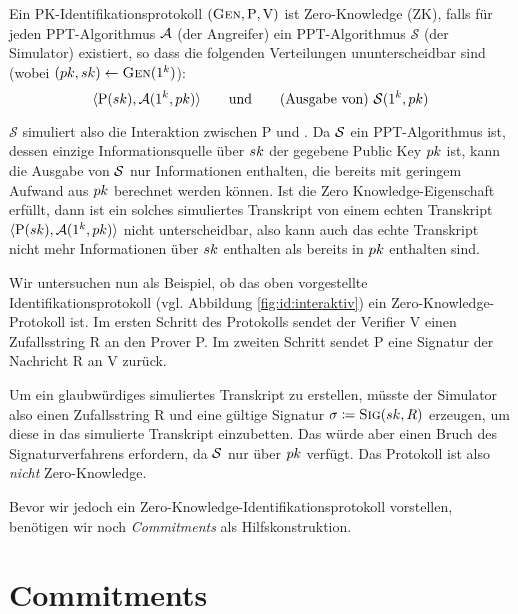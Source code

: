 \begin{definition}
  \label{def:zk}
  Ein PK-Identifikationsprotokoll $(\textsc{Gen}, \mathrm{P}, \mathrm{V})$ ist
  Zero-Knowledge (ZK), falls für jeden PPT-Algorithmus $\mathcal{A}$ (der
  Angreifer) ein PPT-Algorithmus $\mathcal{S}$ (der Simulator) existiert,
  so dass die folgenden Verteilungen ununterscheidbar sind (wobei
  $(pk, sk) \leftarrow \textsc{Gen}(1^k)$):
  \[
    \langle \mathrm{P}(sk), \mathcal{A}(1^k, pk) \rangle \text{\qquad und\qquad (Ausgabe von) } \mathcal{S}(1^k, pk)
  \]
\end{definition}

$\mathcal{S}$ simuliert also die Interaktion zwischen P und \A. Da
$\mathcal{S}$ ein PPT-Algorithmus ist, dessen einzige Informationsquelle über
$sk$ der gegebene Public Key $pk$ ist, kann die Ausgabe von $\mathcal{S}$
nur Informationen enthalten, die bereits mit geringem Aufwand aus
$pk$ berechnet werden können. Ist die Zero Knowledge-Eigenschaft
erfüllt, dann ist ein solches simuliertes Transkript von einem echten
Transkript $\langle \mathrm{P}(sk), \mathcal{A}(1^k, pk) \rangle$ nicht
unterscheidbar, also kann auch das echte Transkript nicht mehr
Informationen über $sk$ enthalten als bereits in $pk$ enthalten
sind.

Wir untersuchen nun als Beispiel, ob das oben vorgestellte
Identifikationsprotokoll (vgl. Abbildung \ref{fig:id:interaktiv}) ein
Zero-Knowledge-Protokoll ist. Im ersten Schritt des Protokolls sendet
der Verifier V einen Zufallsstring R an den Prover P. Im zweiten Schritt
sendet P eine Signatur der Nachricht R an V zurück.

Um ein glaubwürdiges simuliertes Transkript zu erstellen, müsste der
Simulator also einen Zufallsstring R und eine gültige Signatur $\sigma
\coloneqq \textsc{Sig}(sk, R)$ erzeugen, um diese in das simulierte Transkript
einzubetten. Das würde aber einen Bruch des Signaturverfahrens
erfordern, da $\mathcal{S}$ nur über $pk$ verfügt. Das Protokoll ist also
\emph{nicht} Zero-Knowledge.

Bevor wir jedoch ein Zero-Knowledge-Identifikationsprotokoll vorstellen,
benötigen wir noch \emph{Commitments} als Hilfskonstruktion.
\section{Commitments}

